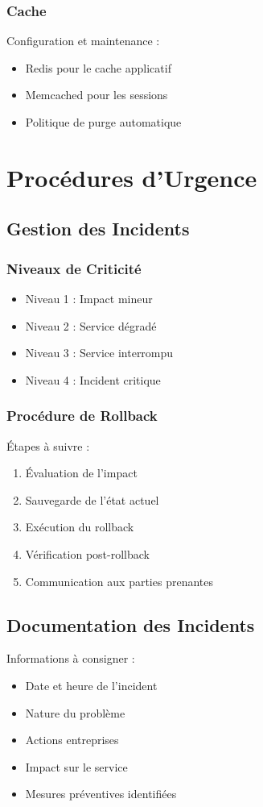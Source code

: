 \documentclass[14pt,a4paper]{report}
\begin{document}
\subsection{Cache}
Configuration et maintenance :
\begin{itemize}
    \item Redis pour le cache applicatif
    \item Memcached pour les sessions
    \item Politique de purge automatique
\end{itemize}

\chapter{Procédures d'Urgence}

\section{Gestion des Incidents}
\subsection{Niveaux de Criticité}
\begin{itemize}
    \item Niveau 1 : Impact mineur
    \item Niveau 2 : Service dégradé
    \item Niveau 3 : Service interrompu
    \item Niveau 4 : Incident critique
\end{itemize}

\subsection{Procédure de Rollback}
Étapes à suivre :
\begin{enumerate}
    \item Évaluation de l'impact
    \item Sauvegarde de l'état actuel
    \item Exécution du rollback
    \item Vérification post-rollback
    \item Communication aux parties prenantes
\end{enumerate}

\section{Documentation des Incidents}
Informations à consigner :
\begin{itemize}
    \item Date et heure de l'incident
    \item Nature du problème
    \item Actions entreprises
    \item Impact sur le service
    \item Mesures préventives identifiées
\end{itemize}
\end{document}
